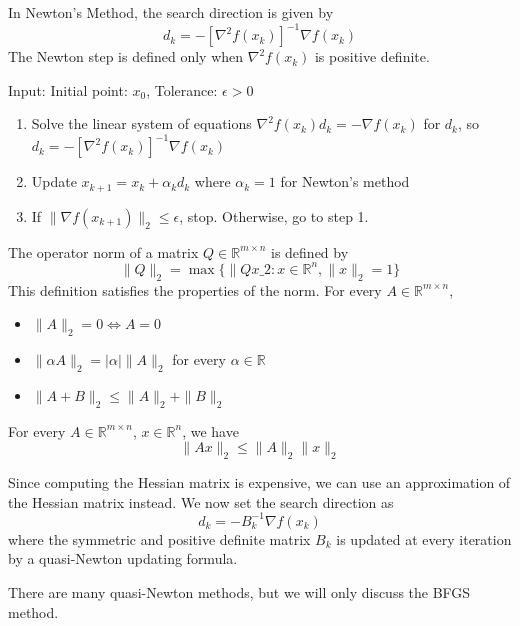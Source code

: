 In Newton's Method, the search direction is given by $$d_k = -[\nabla^2 f(x_k)]^{-1} \nabla f(x_k)$$
The Newton step is defined only when $\nabla^2 f(x_k)$ is positive definite.
\begin{definition}
  Input: Initial point: $x_0$, Tolerance: $\epsilon > 0$
  \begin{enumerate}
    \item Solve the linear system of equations $\nabla^2 f(x_k) d_k = -\nabla f(x_k)$ for $d_k$, so $d_k = -[\nabla^2 f(x_k)]^{-1} \nabla f(x_k)$
    \item Update $x_{k+1} = x_k + \alpha_kd_k$ where $\alpha_k = 1$ for Newton's method
    \item If $\|\nabla f(x_{k+1})\|_2 \leq \epsilon$, stop. Otherwise, go to step 1.
  \end{enumerate}
\end{definition}
\begin{definition}
  The operator norm of a matrix $Q \in \mathbb R^{m \times n}$ is defined by 
  $$\|Q\|_2 = \max\{\|Qx\_2: x \in \mathbb R^n, \|x\|_2 = 1\}$$
  This definition satisfies the properties of the norm. For every $A \in \mathbb R^{m \times n}$,
  \begin{itemize}
    \item $\|A\|_2 = 0 \iff A = 0$
    \item $\|\alpha A\|_2 = |\alpha| \|A\|_2$ for every $\alpha \in \mathbb R$
    \item $\|A + B\|_2 \leq \|A\|_2 + \|B\|_2$
  \end{itemize}
\end{definition}
\begin{theorem}[]
  For every $A \in \mathbb R^{m \times n}$, $x \in \mathbb R^n$, we have
  $$\|Ax\|_2 \leq \|A\|_2 \|x\|_2$$
\end{theorem}
Since computing the Hessian matrix is expensive, we can use an approximation of the Hessian matrix instead. We now set the search direction as
$$d_k = -B_k^{-1} \nabla f(x_k)$$
where the symmetric and positive definite matrix $B_k$ is updated at every iteration by a quasi-Newton updating formula.

\bigskip
There are many quasi-Newton methods, but we will only discuss the BFGS method.

